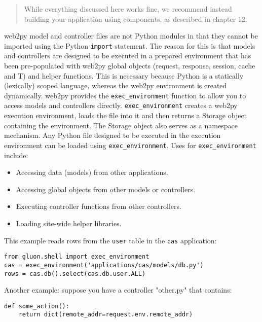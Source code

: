 \documentclass[justified,sixbynine,notoc]{tufte-book}
\def\ft{\small\tt}
\def\inxx#1{\index{#1}}
\begin{document}
\begin{fullwidth}
\inxx{exec\_environment}

\begin{quote}While everything discussed here works fine, we recommend instead building your application using components, as described in chapter 12.\end{quote}
web2py model and controller files are not Python modules in that they cannot be imported using the Python {\ft import} statement. The reason for this is that models and controllers are designed to be executed in a prepared environment that has been pre-populated with web2py global objects (request, response, session, cache and T) and helper functions. This is necessary because Python is a statically (lexically) scoped language, whereas the web2py environment is created dynamically.
\noindent web2py provides the {\ft exec\_environment} function to allow you to access models and controllers directly. {\ft exec\_environment} creates a web2py execution environment, loads the file into it and then returns a Storage object containing the environment. The Storage object also serves as a namespace mechanism. Any Python file designed to be executed in the execution environment can be loaded using {\ft exec\_environment}. Uses for {\ft exec\_environment} include:
\begin{itemize}
\item Accessing data (models) from other applications.

\item Accessing global objects from other models or controllers.

\item Executing controller functions from other controllers.

\item Loading site-wide helper libraries.
\end{itemize}

This example reads rows from the {\ft user} table in the {\ft cas} application:
\begin{lstlisting}
from gluon.shell import exec_environment
cas = exec_environment('applications/cas/models/db.py')
rows = cas.db().select(cas.db.user.ALL)
\end{lstlisting}

Another example: suppose you have a controller "other.py" that contains:
\begin{lstlisting}
def some_action():
    return dict(remote_addr=request.env.remote_addr)
\end{lstlisting}


\end{fullwidth}
\end{document}
